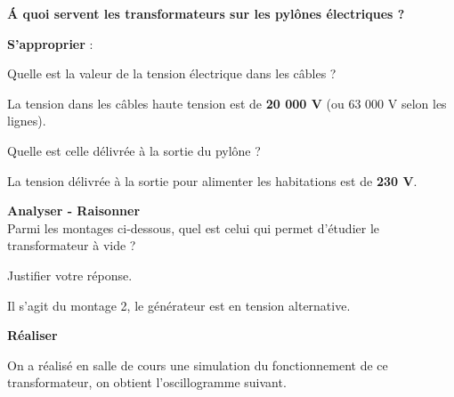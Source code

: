 \documentclass[11pt,a4paper]{article}
\begin{document}
\begin{center}
    
\textbf{\'A quoi servent les transformateurs sur les pylônes électriques ? }
\end{center}


\textbf{ S'approprier} :

\begin{fleche}
    \item Quelle est la valeur de la tension électrique dans les câbles ? 

    \vspace{2mm}

\begin{tcolorbox}[colback=red!5!white,colframe=red!75!black]
La tension dans les câbles haute tension est de \textbf{20 000 V} (ou 63 000 V selon les lignes).
\end{tcolorbox}

        \item Quelle est celle délivrée à la sortie du pylône ? 

    \vspace{2mm}

\begin{tcolorbox}[colback=red!5!white,colframe=red!75!black]
La tension délivrée à la sortie pour alimenter les habitations est de \textbf{230 V}.
\end{tcolorbox}
    
\end{fleche}





\textbf{ Analyser - Raisonner} \\

Parmi les montages ci-dessous, quel est celui qui permet d'étudier le transformateur à vide ? 
 
 Justifier votre réponse. 


\begin{tcolorbox}[colback=red!5!white,colframe=red!75!black]
Il s'agit du montage 2, le générateur est en tension alternative. 
\end{tcolorbox}


 





\textbf{ Réaliser}


On a réalisé en salle de cours une simulation du fonctionnement de ce transformateur, on obtient l'oscillogramme suivant.
\end{document}
